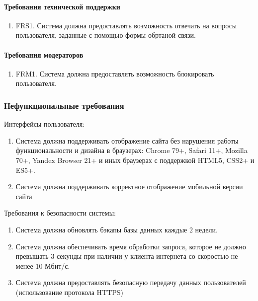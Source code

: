 \paragraph{Требования технической поддержки}
\begin{enumerate}
  \item FRS1. Система должна предоставлять возможность отвечать на вопросы пользователя, заданные с помощью
    формы обртаной связи.
\end{enumerate}

\paragraph{Требования модераторов}
\begin{enumerate}
  \item FRM1. Система должна предоставлять возможность блокировать пользователя.
\end{enumerate}


\subsubsection{Нефункциональные требования}
Интерфейсы пользователя:
\begin{enumerate}
\item Система должна поддерживать отображение сайта без нарушения работы функциональности и  дизайна в браузерах: Chrome 79+, Safari 11+, Mozilla 70+, Yandex Browser 21+ и иных браузерах с поддержкой HTML5, CSS2+ и ES5+.
\item Система должна поддерживать корректное отображение мобильной версии сайта 
\end{enumerate}

Требования к безопасности системы:

\begin{enumerate}
\item Система должна обновлять бэкапы базы данных каждые 2 недели.
\item Система должна обеспечивать время обработки запроса, которое не должно превышать 3 секунды при наличии у клиента интернета со скоростью не менее 10 Мбит/с.
\item Система должна предоставлять  безопасную передачу данных пользователей (использование протокола HTTPS)
\end{enumerate}

